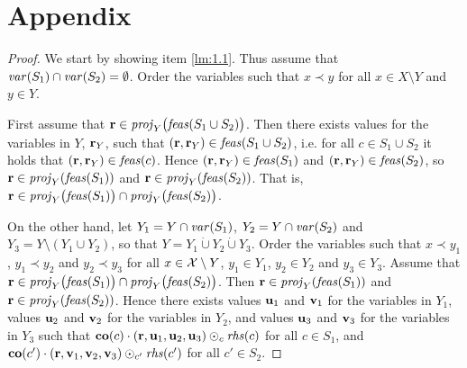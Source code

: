 \section*{Appendix}
\projection*
\begin{proof}
We start by showing item \ref{lm:1.1}. Thus assume that $\mathit{var}(S_1)\cap\mathit{var}(S_2) = \emptyset$. Order the variables such that $x\prec y$ for all $x\in X\setminus Y$ and $y\in Y$.

First assume that $\mathbf{r}\in \mathit{proj}_Y\big(\mathit{feas}(S_1\cup S_2)\big)$. Then there exists values for the variables in $Y$, $\mathbf{r}_Y$, such that $(\mathbf{r},\mathbf{r}_Y)\in\mathit{feas}(S_1\cup S_2)$, i.e. for all $c\in S_1\cup S_2$ it holds that $(\mathbf{r},\mathbf{r}_Y)\in\mathit{feas}(c)$. Hence $(\mathbf{r},\mathbf{r}_Y)\in\mathit{feas}(S_1)$ and $(\mathbf{r},\mathbf{r}_Y)\in\mathit{feas}(S_2)$, so $\mathbf{r}\in \mathit{proj}_Y(\mathit{feas}(S_1))$ and $\mathbf{r}\in \mathit{proj}_Y(\mathit{feas}(S_2))$. That is, $\mathbf{r}\in\mathit{proj}_Y\big(\mathit{feas}(S_1)\big)\cap \mathit{proj}_Y\big(\mathit{feas}(S_2)\big)$.

On the other hand, let $Y_1 = Y\cap \mathit{var}(S_1)$, $Y_2 = Y\cap \mathit{var}(S_2)$ and $Y_3 = Y\setminus (Y_1 \cup Y_2)$, so that $Y = Y_1\dot\cup Y_2 \dot\cup Y_3$. Order the variables such that %
$x\prec y_1$, $y_1\prec y_2$ and $y_2\prec y_3$ for all $x\in \mathcal{X}\setminus Y$, $y_1\in Y_1$, $y_2\in Y_2$ and $y_3\in Y_3$. 
Assume that $\mathbf{r}\in\mathit{proj}_Y\big(\mathit{feas}(S_1)\big)\cap \mathit{proj}_Y\big(\mathit{feas}(S_2)\big)$. Then $\mathbf{r}\in\mathit{proj}_Y(\mathit{feas}(S_1))$ and $\mathbf{r}\in\mathit{proj}_Y(\mathit{feas}(S_2))$.  
Hence there exists values $\mathbf{u}_1$ and $\mathbf{v}_1$ for the variables in $Y_1$, values $\mathbf{u}_2$ and $\mathbf{v}_2$ for the variables in $Y_2$, and values $\mathbf{u}_3$ and $\mathbf{v}_3$ for the variables in $Y_3$ such that $\mathbf{co}(c)\cdot (\mathbf{r}, \mathbf{u}_1, \mathbf{u}_2, \mathbf{u}_3)\odot_c \mathit{rhs}(c)$ for all $c\in S_1$, and $\mathbf{co}(c')\cdot (\mathbf{r}, \mathbf{v}_1, \mathbf{v}_2, \mathbf{v}_3)\odot_{c'} \mathit{rhs}(c')$ for all $c'\in S_2$. 


\end{proof}
